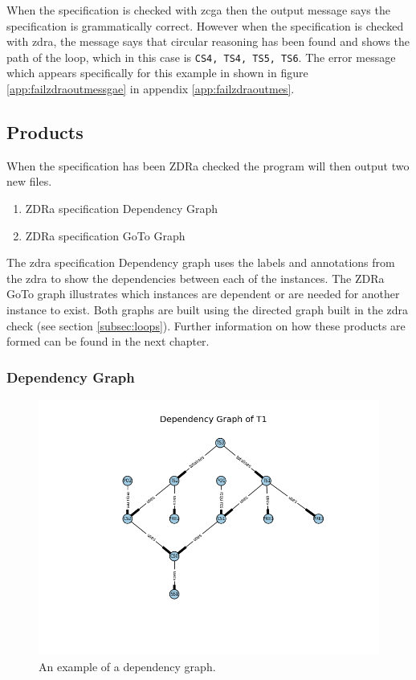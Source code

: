 When the specification is checked with \gls{zcga} then the output message says the specification is grammatically correct. However when the specification is checked with \gls{zdra}, the message says that circular reasoning has been found and shows the path of the loop, which in this case is \verb|CS4, TS4, TS5, TS6|. The error message which appears specifically for this example in shown in figure \ref{app:failzdraoutmessgae} in appendix \ref{app:failzdraoutmes}.

\subsection{Products}
\label{subsec:zdra_prodcuts}

When the specification has been ZDRa checked the program will then output two new files. 

\begin{enumerate}

\item ZDRa specification Dependency Graph

\item ZDRa specification GoTo Graph
\end{enumerate}

The \gls{zdra} specification Dependency graph uses the labels and annotations from the \gls{zdra} to show the dependencies between each of the instances. The ZDRa GoTo graph illustrates which instances are dependent or are needed for another instance to exist. Both graphs are built using the directed graph built in the \gls{zdra} check (see section \ref{subsec:loops}). Further information on how these products are formed can be found in the next chapter.

\subsubsection{Dependency Graph}

\begin{figure}[H]
\centering
\includegraphics[scale=0.6]{Figures/zdra/depgraph.png}
\caption{An example of a dependency graph. \label{fig:depgraph}}
\end{figure}

